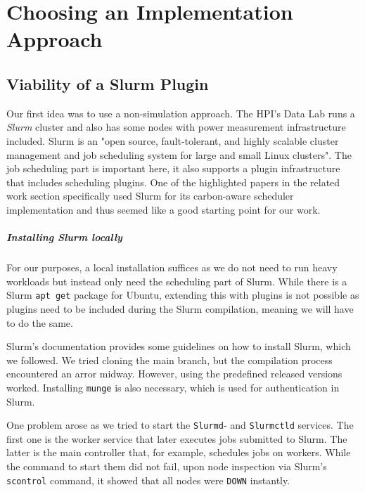 \chapter{Choosing an Implementation Approach}

\section{Viability of a Slurm Plugin}
\label{subsec:slurm_plugin}

Our first idea was to use a non-simulation approach. 
The HPI's Data Lab runs a \emph{Slurm} cluster and also has some nodes with power measurement infrastructure included. 
Slurm is an "open source, fault-tolerant, and highly scalable cluster management and job scheduling system for large and small Linux clusters". 
The job scheduling part is important here, it also supports a plugin infrastructure that includes scheduling plugins. 
One of the highlighted papers\cite{inigo_goiri_greenslot_2011} in the related work section specifically used Slurm for its carbon-aware scheduler implementation and thus seemed like a good starting point for our work.

\paragraph{Installing Slurm locally}

For our purposes, a local installation suffices as we do not need to run heavy workloads but instead only need the scheduling part of Slurm. 
While there is a Slurm \verb|apt get| package for Ubuntu, extending this with plugins is not possible as plugins need to be included during the Slurm compilation, meaning we will have to do the same.

Slurm's documentation provides some guidelines on how to install Slurm, which we followed. 
We tried cloning the main branch, but the compilation process encountered an arror midway. However, using the predefined released versions worked.
Installing \verb|munge| is also necessary, which is used for authentication in Slurm.

One problem arose as we tried to start the \verb|Slurmd|- and \verb|Slurmctld| services. The first one is the worker service that later executes jobs submitted to Slurm. The latter is the main controller that, for example, schedules jobs on workers. While the command to start them did not fail, upon node inspection via Slurm's \verb|scontrol| command, it showed that all nodes were \verb|DOWN| instantly.

